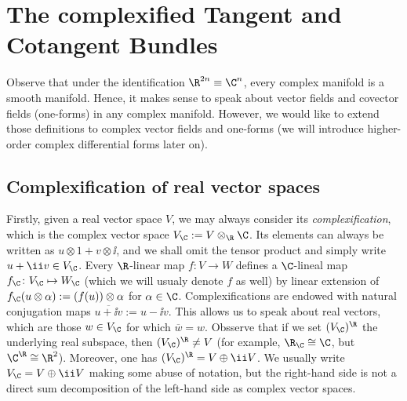 

\section{The complexified Tangent and Cotangent Bundles} \label{section_complexified_bundles}
Observe that under the identification \(\R^{2n} \equiv \C^n\), every complex manifold is a smooth manifold. Hence, it makes sense to speak about vector fields and covector fields (one-forms) in any complex manifold. However, we would like to extend those definitions to complex vector fields and one-forms (we will introduce higher-order complex differential forms later on).

\subsection{Complexification of real vector spaces} \label{section_complexification}
Firstly, given a real vector space \(V\), we may always consider its \textit{complexification}, which is the complex vector space \(V_\C:=V \otimes_\R \C\). Its elements can always be written as \(u\otimes 1+ v \otimes \ii\), and we shall omit the tensor product and simply write \(u+ \ii v \in V_\C\). Every \(\R\)-linear map \(f\colon V \to W\) defines a \(\C\)-lineal map \(f_\C\colon V_\C \mapsto W_\C\) (which we will usualy denote \(f\) as well) by linear extension of \(f_\C(u \otimes \alpha):=(f(u)) \otimes \alpha\) for \(\alpha \in \C\). Complexifications are endowed with natural conjugation maps \(\overline{u+ \ii v}:=u-\ii v\). This allows us to speak about real vectors, which are those \(w \in V_\C\) for which \(\overline{w}=w\). Obsserve that if we set \((V_\C)^\R\) the underlying real subspace, then \((V_\C)^\R\neq V\) (for example, \(\R_\C\cong \C\), but \(\C^\R\cong \R^2\)). Moreover, one has \((V_\C)^\R=V\oplus \ii V\). We usually write \(V_\C=V \oplus \ii V\) making some abuse of notation, but the right-hand side is not a direct sum decomposition of the left-hand side as complex vector spaces.

